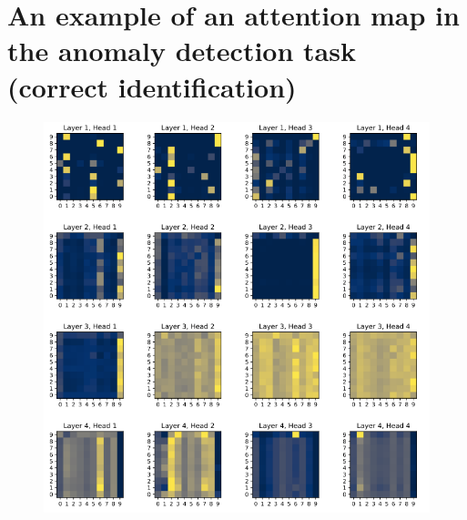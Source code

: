 \documentclass[peerreview]{IEEEtran}
\begin{document}
\section{An example of an attention map in the anomaly detection task (correct identification)} \label{App:anomaly_attention_map_correct}
\begin{figure}[!h]
\centering
\includegraphics[width=1\columnwidth]{anomaly_attention_map_correct.png} 
\end{figure}
\newpage
\end{document}
